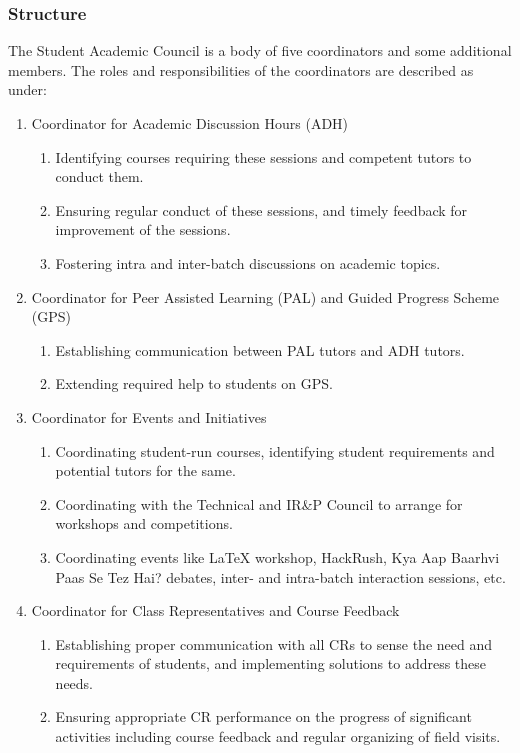 \documentclass[12pt]{article}
\begin{document}
\subsubsection{Structure}
The Student Academic Council is a body of five coordinators and
some additional members. The roles and responsibilities of the
coordinators are described as under:
\begin{enumerate}
    \item Coordinator for Academic Discussion Hours (ADH)
    \begin{enumerate}
        \item Identifying courses requiring these sessions and competent tutors to conduct them.
        \item Ensuring regular conduct of these sessions, and timely feedback for improvement of the sessions.
        \item Fostering intra and inter-batch discussions on academic topics.
    \end{enumerate}
    \item Coordinator for Peer Assisted Learning (PAL) and Guided Progress Scheme (GPS)
    \begin{enumerate}
        \item Establishing communication between PAL tutors and ADH tutors.
        \item Extending required help to students on GPS.
    \end{enumerate}
    \item Coordinator for Events and Initiatives
    \begin{enumerate}
        \item Coordinating student-run courses, identifying student requirements and potential tutors for the same.
        \item Coordinating with the Technical and IR\&P Council to arrange for workshops and competitions.
        \item Coordinating events like LaTeX workshop, HackRush, Kya Aap Baarhvi Paas Se Tez Hai? debates, inter- and intra-batch interaction sessions, etc.
    \end{enumerate}
    \item Coordinator for Class Representatives and Course Feedback
    \begin{enumerate}
        \item Establishing proper communication with all CRs to sense the need and requirements of students, and implementing solutions to address these needs.
        \item Ensuring appropriate CR performance on the progress of significant activities including course feedback and regular organizing of field visits.

\end{enumerate}
\end{enumerate}
\end{document}
